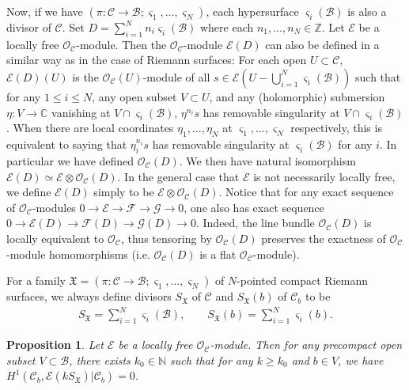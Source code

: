\documentclass[12pt,a4paper,notitlepage]{report}
\theoremstyle{definition}
\theoremstyle{plain}
\newtheorem{pp}[df]{Proposition}
\newcommand{\fk}{\mathfrak}
\newcommand{\mc}{\mathcal}
\newcommand{\scr}{\mathscr}
\newcommand{\sgm}{\varsigma}
\newcommand{\SX}{S_{\fk X}}
\newcommand{\Nbb}{\mathbb N}
\numberwithin{equation}{section}
\begin{document}
Now, if we have $(\pi:\mc C\rightarrow\mc B;\sgm_1,\dots,\sgm_N)$, each hypersurface $\sgm_i(\mc B)$ is also a divisor of $\mc C$. Set $D=\sum_{i=1}^Nn_i\sgm_i(\mc B)$ where each $n_1,\dots,n_N\in\mathbb Z$. Let $\scr E$ be a locally free $\scr O_{\mc C}$-module. Then the $\scr O_{\mc C}$-module $\scr E(D)$ can also be defined in a similar way as in the case of Riemann surfaces: For each open $U\subset \mc C$, $\scr E(D)(U)$ is the $\scr O_{\mc C}(U)$-module of all $s\in\scr E(U-\bigcup_{i=1}^N\sgm_i(\mc B))$ such that for any $1\leq i\leq N$, any open subset $V\subset U$, and any (holomorphic) submersion $\eta:V\rightarrow \mathbb C$ vanishing at $V\cap\sgm_i(\mc B)$, $\eta^{n_i}s$ has removable singularity at $V\cap\sgm_i(\mc B)$. \index{ED@$\scr E(D),\scr O_C(D)$} When there are local coordinates $\eta_1,\dots,\eta_N$ at $\sgm_1,\dots,\sgm_N$ respectively, this is equivalent to saying that $\eta_i^{n_i}s$ has removable singularity at $\sgm_i(\mc B)$ for any $i$. In particular we have defined $\scr O_{\mc C}(D)$. We then have natural isomorphism $\scr E(D)\simeq\scr E\otimes\scr O_{\mc C}(D)$. In the general case that  $\scr E$ is not necessarily locally free, we define $\scr E(D)$ simply to be $\scr E\otimes\scr O_{\mc C}(D)$. Notice that for any exact sequence of $\scr O_{\mc C}$-modules $0\rightarrow\scr E\rightarrow\scr F\rightarrow\scr G\rightarrow 0$, one also has exact sequence $0\rightarrow\scr E(D)\rightarrow\scr F(D)\rightarrow\scr G(D)\rightarrow 0$. Indeed,  the line bundle $\scr O_{\mc C}(D)$ is locally equivalent to $\scr O_{\mc C}$, thus tensoring by $\scr O_{\mc C}(D)$ preserves the exactness of $\scr O_{\mc C}$-module homomorphisms (i.e. $\scr O_{\mc C}(D)$ is a flat $\scr O_{\mc C}$-module).

For a family $\fk X=(\pi:\mc C\rightarrow\mc B;\sgm_1,\dots,\sgm_N)$ of $N$-pointed compact Riemann surfaces, we always define divisors $\SX$ of $\mc C$ and $\SX(b)$ of $\mc C_b$ \index{SX@$\SX$, $\SX(b)$} to be
\begin{gather*}
\SX=\sum_{i=1}^N\sgm_i(\mc B),\qquad \SX(b)=\sum_{i=1}^N\sgm_i(b).
\end{gather*}


\begin{pp}\label{lb129}
Let $\scr E$ be a locally free $\scr O_{\mc C}$-module. Then for any precompact open subset $V\subset\mc B$, there exists $k_0\in\Nbb$ such that for any $k\geq k_0$ and $b\in V$, we have $H^1(\mc C_b,\scr E(k\SX)|\mc C_b)=0$.
\end{pp}
\end{document}
